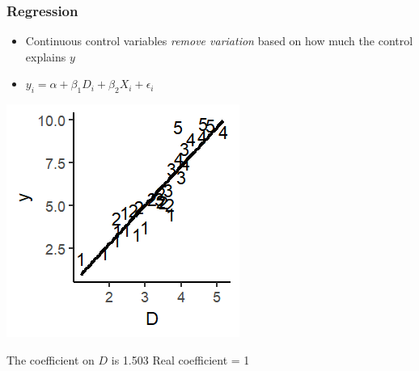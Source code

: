 \documentclass[xcolor=x11names,compress]{beamer}\usepackage[]{graphicx}\usepackage[]{color}
\makeatletter
\def\maxwidth{ %
  \ifdim\Gin@nat@width>\linewidth
    \linewidth
  \else
    \Gin@nat@width
  \fi
}
\newenvironment{knitrout}{}{} %
\renewcommand{\(}{\begin{columns}}
\renewcommand{\)}{\end{columns}}
\newcommand{\<}[1]{\begin{column}{#1}}
\renewcommand{\>}{\end{column}}
\makeatother
\begin{document}
\begin{frame}
\frametitle{Regression}
\begin{itemize}
\item Continuous control variables \textit{remove variation} based on how much the control explains $y$
\item $y_i = \alpha + \beta_1 D_i + \beta_2 X_i + \epsilon_i$
\end{itemize}
\begin{multicols}{2}
\begin{knitrout}
\color{fgcolor}
\includegraphics[width=\maxwidth]{figure/graph_ols_control2-1} 

\end{knitrout}
\columnbreak
The coefficient on $D$ is 1.503
Real coefficient = 1
\end{multicols}
\end{frame}
\end{document}
